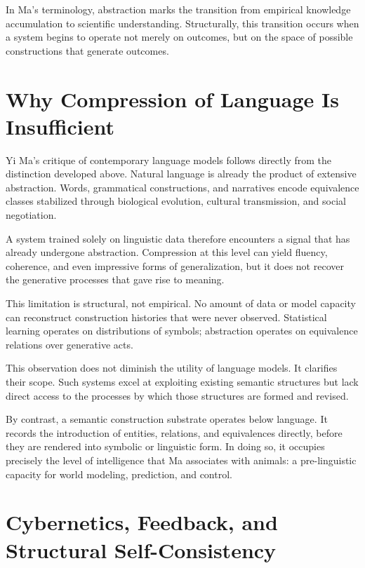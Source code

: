 \documentclass[11pt]{article}
\begin{document}
In Ma’s terminology, abstraction marks the transition from empirical
knowledge accumulation to scientific understanding. Structurally, this
transition occurs when a system begins to operate not merely on outcomes,
but on the space of possible constructions that generate outcomes.

\section{Why Compression of Language Is Insufficient}

Yi Ma’s critique of contemporary language models follows directly from the
distinction developed above. Natural language is already the product of
extensive abstraction. Words, grammatical constructions, and narratives
encode equivalence classes stabilized through biological evolution,
cultural transmission, and social negotiation.

A system trained solely on linguistic data therefore encounters a signal
that has already undergone abstraction. Compression at this level can
yield fluency, coherence, and even impressive forms of generalization, but
it does not recover the generative processes that gave rise to meaning.

This limitation is structural, not empirical. No amount of data or model
capacity can reconstruct construction histories that were never observed.
Statistical learning operates on distributions of symbols; abstraction
operates on equivalence relations over generative acts.

This observation does not diminish the utility of language models. It
clarifies their scope. Such systems excel at exploiting existing semantic
structures but lack direct access to the processes by which those
structures are formed and revised.

By contrast, a semantic construction substrate operates below language.
It records the introduction of entities, relations, and equivalences
directly, before they are rendered into symbolic or linguistic form. In
doing so, it occupies precisely the level of intelligence that Ma
associates with animals: a pre-linguistic capacity for world modeling,
prediction, and control.

\section{Cybernetics, Feedback, and Structural Self-Consistency}
\end{document}
